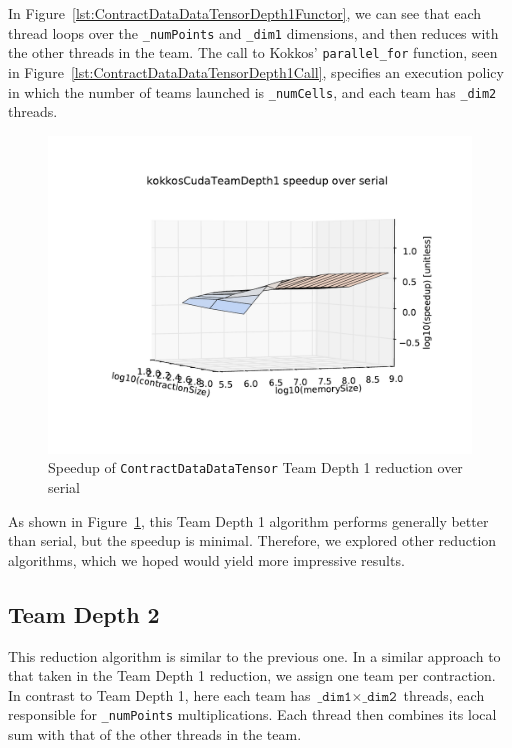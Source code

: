 In Figure~\ref{lst:ContractDataDataTensorDepth1Functor}, we can see that each
thread loops over the \texttt{\_numPoints} and \texttt{\_dim1} dimensions, and then
reduces with the other threads in the team.  The call to Kokkos'
\texttt{parallel\_for} function, seen in
Figure~\ref{lst:ContractDataDataTensorDepth1Call}, specifies an execution policy
in which the number of teams launched is \texttt{\_numCells}, and each team has
\texttt{\_dim2} threads.

\begin{figure}[ht]
    \includegraphics[scale=.55]{./VersusSerial_kokkosCudaTeamDepth1_clearCache_shadowfax}
    \caption[Performance of \texttt{ContractDataDataTensor} Team Depth
    1]{Speedup of \texttt{ContractDataDataTensor} Team Depth 1 reduction over
    serial
\label{fig:ContractDataDataTensorDepth1}} 
\end{figure}

As shown in Figure~\ref{fig:ContractDataDataTensorDepth1}, this Team Depth 1
algorithm performs generally better than serial, but the speedup is minimal.
Therefore, we explored other reduction algorithms, which we hoped would yield
more impressive results.

\subsection{Team Depth 2}
    This reduction algorithm is similar to the previous one.  In a similar
    approach to that taken in the Team Depth 1 reduction, we assign one team per
    contraction.  In contrast to Team Depth 1, here each team has
    $\texttt{\_dim1} \times \texttt{\_dim2}$ threads, each responsible for
    \texttt{\_numPoints} multiplications.  Each thread then combines its local
    sum with that of the other threads in the team.


